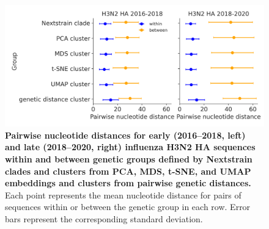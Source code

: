 \begin{figure}[!h]
\includegraphics[width=\columnwidth]{figures/within_between_influenza.png}
\caption{{\bf Pairwise nucleotide distances for early (2016--2018, left) and late (2018--2020, right) influenza H3N2 HA sequences within and between genetic groups defined by Nextstrain clades and clusters from PCA, MDS, t-SNE, and UMAP embeddings and clusters from pairwise genetic distances.}
  Each point represents the mean nucleotide distance for pairs of sequences within or between the genetic group in each row.
  Error bars represent the corresponding standard deviation.}\label{S_Fig_flu_within_between_group_distances}
\end{figure}

